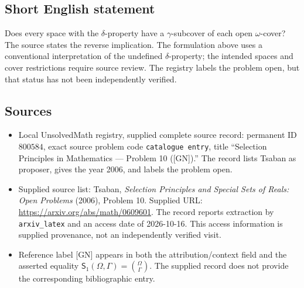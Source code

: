 \documentclass[11pt]{article}
\begin{document}
\subsection{Short English statement}
Does every space with the \(\delta\)-property have a \(\gamma\)-subcover of each open \(\omega\)-cover? The source states the reverse implication. The formulation above uses a conventional interpretation of the undefined \(\delta\)-property; the intended spaces and cover restrictions require source review. The registry labels the problem open, but that status has not been independently verified.
\subsection{Sources}
\begin{itemize}
\item Local UnsolvedMath registry, supplied complete source record: permanent ID \(800584\), exact source problem code \texttt{catalogue entry}, title ``Selection Principles in Mathematics --- Problem 10 ([GN]).'' The record lists Tsaban as proposer, gives the year 2006, and labels the problem open.
\item Supplied source list: Tsaban, \emph{Selection Principles and Special Sets of Reals: Open Problems} (2006), Problem 10. Supplied URL: \url{https://arxiv.org/abs/math/0609601}. The record reports extraction by \texttt{arxiv\_latex} and an access date of 2026-10-16. This access information is supplied provenance, not an independently verified visit.
\item Reference label [GN] appears in both the attribution/context field and the asserted equality \(\mathsf S_1(\Omega,\Gamma)=\binom{\Omega}{\Gamma}\). The supplied record does not provide the corresponding bibliographic entry.
\end{itemize}
\end{document}
